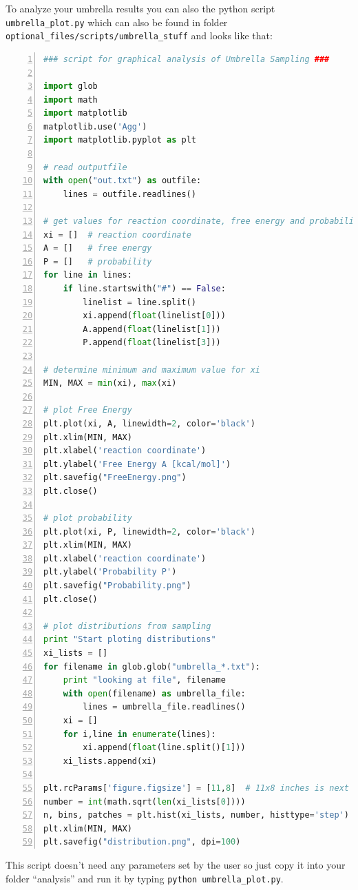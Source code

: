 \documentclass[a4paper,11pt]{scrartcl}
\begin{document}
To analyze your umbrella results you can also the python script \texttt{umbrella\_plot.py} which can also be found in folder \texttt{optional\_files/scripts/umbrella\_stuff} and looks like that:
\begin{lstlisting}[frame=single,language=python,basicstyle=\footnotesize,commentstyle=\color{red},keywordstyle=\color{blue},stringstyle=\color{mygreen},numbers=left,escapechar=|]
### script for graphical analysis of Umbrella Sampling ###

import glob
import math
import matplotlib
matplotlib.use('Agg')
import matplotlib.pyplot as plt

# read outputfile
with open("out.txt") as outfile:
    lines = outfile.readlines()

# get values for reaction coordinate, free energy and probability
xi = []  # reaction coordinate
A = []   # free energy
P = []   # probability
for line in lines:
    if line.startswith("#") == False:
        linelist = line.split()
        xi.append(float(linelist[0]))
        A.append(float(linelist[1]))
        P.append(float(linelist[3]))

# determine minimum and maximum value for xi
MIN, MAX = min(xi), max(xi)

# plot Free Energy
plt.plot(xi, A, linewidth=2, color='black')
plt.xlim(MIN, MAX)
plt.xlabel('reaction coordinate')
plt.ylabel('Free Energy A [kcal/mol]')
plt.savefig("FreeEnergy.png")
plt.close()

# plot probability
plt.plot(xi, P, linewidth=2, color='black')
plt.xlim(MIN, MAX)
plt.xlabel('reaction coordinate')
plt.ylabel('Probability P')
plt.savefig("Probability.png")
plt.close()

# plot distributions from sampling
print "Start ploting distributions"
xi_lists = []
for filename in glob.glob("umbrella_*.txt"):
    print "looking at file", filename
    with open(filename) as umbrella_file:
        lines = umbrella_file.readlines()
    xi = []
    for i,line in enumerate(lines):
        xi.append(float(line.split()[1]))
    xi_lists.append(xi)

plt.rcParams['figure.figsize'] = [11,8]  # 11x8 inches is next to DinA4
number = int(math.sqrt(len(xi_lists[0])))
n, bins, patches = plt.hist(xi_lists, number, histtype='step')
plt.xlim(MIN, MAX)
plt.savefig("distribution.png", dpi=100)  
\end{lstlisting}

This script doesn't need any parameters set by the user so just copy it into your folder ``analysis'' and run it by typing \texttt{python umbrella\_plot.py}. 
\end{document}
